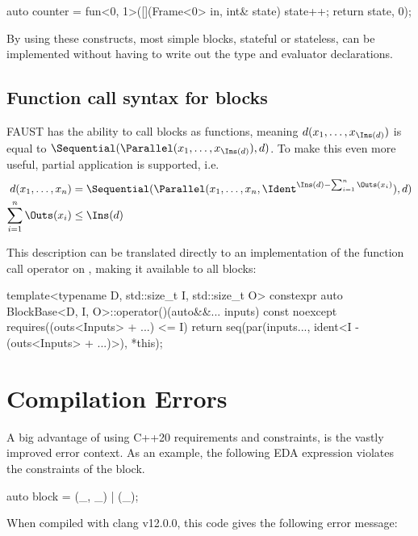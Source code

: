 \begin{cppcodenl}
  auto counter = fun<0, 1>([](Frame<0> in, int& state) { state++; return {state}}, 0);
\end{cppcodenl}

By using these constructs, most simple blocks, stateful or stateless, can be implemented without having to
write out the type and evaluator declarations.

\subsection{Function call syntax for blocks}
\label{sec:eda_partial_application}

FAUST has the ability to call blocks as functions, meaning $d(x_1, \dots, x_{\Ins(d)})$ is equal to
$\Sequential(\Parallel(x_1, \dots, x_{\Ins(d)}), d)$. To make this even more useful, partial application is supported, i.e.
% 
\begin{align*}
  d(x_1, \dots, x_n)      & ={} \Sequential(\Parallel(x_1, \dots, x_n, \Ident^{\Ins(d) - \sum^n_{i=1} \Outs(x_i)}), d) \\
  \sum^n_{i=1} \Outs(x_i) & \leq \Ins(d)
\end{align*}

This description can be translated directly to an implementation of the function call operator on
, making it available to all blocks:

\begin{cppcodenl}
  template<typename D, std::size_t I, std::size_t O>
  constexpr auto BlockBase<D, I, O>::operator()(auto&&... inputs) const noexcept
  requires((outs<Inputs> + ...) <= I)
  {
    return seq(par(inputs..., ident<I - (outs<Inputs> + ...)>), *this);
  }
\end{cppcodenl}

\section{Compilation Errors}
\label{sec:eda_errors}

A big advantage of using C++20 requirements and constraints, is the vastly improved error context. As an
example, the following EDA expression violates the constraints of the \Sequential block.

\begin{cppcodenl}
auto block = (_, _) | (_);
\end{cppcodenl}

When compiled with clang v12.0.0, this code gives the following error message:

